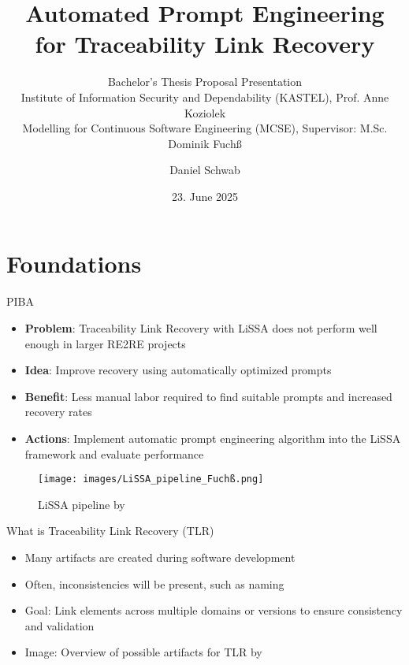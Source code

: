 \documentclass{sdqbeamer}
\title[Automated Prompt Engineering for Traceability Link Recovery]{Automated Prompt Engineering for Traceability Link Recovery}
\subtitle{Bachelor's Thesis Proposal Presentation \\
Institute of Information Security and Dependability (KASTEL), Prof. Anne Koziolek \\
Modelling for Continuous Software Engineering (MCSE), Supervisor:  M.Sc. Dominik Fuchß}
\author{Daniel Schwab}
\date[23.\,06.\,2025]{23. June 2025}
\begin{document}
\begin{frame}[title white horizontal, picture=images/palladio_bauplan, kitlogo=white]
\titlepage
\end{frame}


\section{Foundations}

\begin{frame}{PIBA}
    \begin{itemize}
        \item \textbf{Problem}: Traceability Link Recovery with LiSSA does not perform well enough in larger RE2RE projects  
        \item \textbf{Idea}: Improve recovery using automatically optimized prompts
        \item \textbf{Benefit}: Less manual labor required to find suitable prompts and increased recovery rates
        \item \textbf{Actions}: Implement automatic prompt engineering algorithm into the LiSSA framework and evaluate performance
    \end{itemize}
    
    \begin{figure}
        \centering
        \texttt{[image: images/LiSSA\_pipeline\_Fuchß.png]}
        \caption{LiSSA pipeline by \cite{fuchss2025LiSSAGeneric}}
        \label{fig:enter-label}
    \end{figure}
\end{frame}



\begin{frame}[picture 50 vertical, picture=images/artifact_overview_Fuchß.png]{What is Traceability Link Recovery (TLR)}
	\begin{itemize}
		\item Many artifacts are created during software development
            \item Often, inconsistencies will be present, such as naming
            \item Goal: Link elements across multiple domains or versions to ensure consistency and validation
            \item Image: Overview of possible artifacts for TLR by \cite{fuchss2025LiSSAGeneric}
	\end{itemize}
\end{frame}
\end{document}
